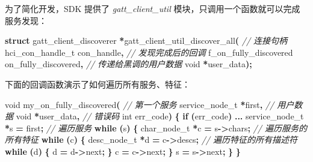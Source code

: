 \documentclass[
  12pt,
]{book}
\newenvironment{Shaded}{\begin{snugshade}}{\end{snugshade}}
\newcommand{\CommentTok}[1]{\textcolor[rgb]{0.56,0.35,0.01}{\textit{#1}}}
\newcommand{\ControlFlowTok}[1]{\textcolor[rgb]{0.13,0.29,0.53}{\textbf{#1}}}
\newcommand{\DataTypeTok}[1]{\textcolor[rgb]{0.13,0.29,0.53}{#1}}
\newcommand{\KeywordTok}[1]{\textcolor[rgb]{0.13,0.29,0.53}{\textbf{#1}}}
\newcommand{\NormalTok}[1]{#1}
\newcommand{\OperatorTok}[1]{\textcolor[rgb]{0.81,0.36,0.00}{\textbf{#1}}}
\begin{document}
为了简化开发，SDK 提供了 \emph{gatt\_client\_util} 模块，只调用一个函数就可以完成服务发现：

\begin{Shaded}
\begin{Highlighting}[]
\KeywordTok{struct}\NormalTok{ gatt\_client\_discoverer }\OperatorTok{*}\NormalTok{gatt\_client\_util\_discover\_all}\OperatorTok{(}
    \CommentTok{// 连接句柄}
\NormalTok{    hci\_con\_handle\_t con\_handle}\OperatorTok{,}
    \CommentTok{// 发现完成后的回调}
\NormalTok{    f\_on\_fully\_discovered on\_fully\_discovered}\OperatorTok{,}
    \CommentTok{// 传递给黑调的用户数据}
    \DataTypeTok{void} \OperatorTok{*}\NormalTok{user\_data}\OperatorTok{);}
\end{Highlighting}
\end{Shaded}

下面的回调函数演示了如何遍历所有服务、特征：

\begin{Shaded}
\begin{Highlighting}[]
\DataTypeTok{void}\NormalTok{ my\_on\_fully\_discovered}\OperatorTok{(}
    \CommentTok{// 第一个服务}
\NormalTok{    service\_node\_t }\OperatorTok{*}\NormalTok{first}\OperatorTok{,}
    \CommentTok{// 用户数据}
    \DataTypeTok{void} \OperatorTok{*}\NormalTok{user\_data}\OperatorTok{,}
    \CommentTok{// 错误码}
    \DataTypeTok{int}\NormalTok{ err\_code}\OperatorTok{)}
\OperatorTok{\{}
    \ControlFlowTok{if} \OperatorTok{(}\NormalTok{err\_code}\OperatorTok{)} \OperatorTok{...}
\NormalTok{    service\_node\_t }\OperatorTok{*}\NormalTok{s }\OperatorTok{=}\NormalTok{ first}\OperatorTok{;}
    \CommentTok{// 遍历服务}
    \ControlFlowTok{while} \OperatorTok{(}\NormalTok{s}\OperatorTok{)}
    \OperatorTok{\{}
\NormalTok{        char\_node\_t }\OperatorTok{*}\NormalTok{c }\OperatorTok{=}\NormalTok{ s}\OperatorTok{{-}\textgreater{}}\NormalTok{chars}\OperatorTok{;}
        \CommentTok{// 遍历服务的所有特征}
        \ControlFlowTok{while} \OperatorTok{(}\NormalTok{c}\OperatorTok{)}
        \OperatorTok{\{}
\NormalTok{            desc\_node\_t }\OperatorTok{*}\NormalTok{d }\OperatorTok{=}\NormalTok{ c}\OperatorTok{{-}\textgreater{}}\NormalTok{descs}\OperatorTok{;}
            \CommentTok{// 遍历特征的所有描述符}
            \ControlFlowTok{while} \OperatorTok{(}\NormalTok{d}\OperatorTok{)}
            \OperatorTok{\{}
\NormalTok{                d }\OperatorTok{=}\NormalTok{ d}\OperatorTok{{-}\textgreater{}}\NormalTok{next}\OperatorTok{;}
            \OperatorTok{\}}
\NormalTok{            c }\OperatorTok{=}\NormalTok{ c}\OperatorTok{{-}\textgreater{}}\NormalTok{next}\OperatorTok{;}
        \OperatorTok{\}}
\NormalTok{        s }\OperatorTok{=}\NormalTok{ s}\OperatorTok{{-}\textgreater{}}\NormalTok{next}\OperatorTok{;}
    \OperatorTok{\}}
\OperatorTok{\}}
\end{Highlighting}
\end{Shaded}
\end{document}
